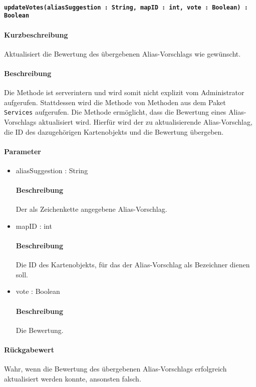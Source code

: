 \paragraph{\texttt{updateVotes(aliasSuggestion : String, mapID : int, vote : Boolean) : Boolean}}%
\paragraph*{Kurzbeschreibung}
Aktualisiert die Bewertung des übergebenen Alias-Vorschlags wie gewünscht.
\paragraph*{Beschreibung}
Die Methode ist serverintern und wird somit nicht explizit vom Administrator aufgerufen.
Stattdessen wird die Methode von Methoden aus dem Paket \texttt{Services} aufgerufen.
Die Methode ermöglicht, dass die Bewertung eines Alias-Vorschlags aktualisiert wird.
Hierfür wird der zu aktualisierende Alias-Vorschlag, die ID des dazugehörigen Kartenobjekts und die Bewertung übergeben.
\paragraph*{Parameter}
\begin{itemize}
    \item aliasSuggestion : String
    		\paragraph*{Beschreibung}
    		Der als Zeichenkette angegebene Alias-Vorschlag.
    	\item mapID : int
    		\paragraph*{Beschreibung}
    		Die ID des Kartenobjekts, für das der Alias-Vorschlag als Bezeichner dienen soll.
    	\item vote : Boolean
    		\paragraph*{Beschreibung}
    		Die Bewertung.
\end{itemize}
\paragraph*{Rückgabewert}
Wahr, wenn die Bewertung des übergebenen Alias-Vorschlags erfolgreich aktualisiert werden konnte, ansonsten falsch.

